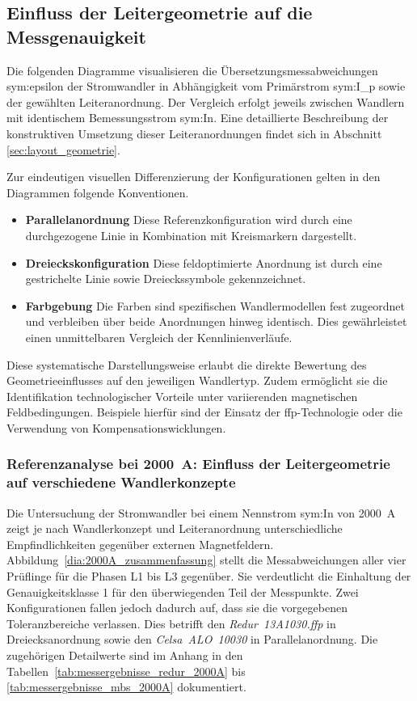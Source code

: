 \subsection{Einfluss der Leitergeometrie auf die Messgenauigkeit}
\label{sec:einfluss_leitergeometrie}

Die folgenden Diagramme visualisieren die Übersetzungsmessabweichungen \gls{sym:epsilon} der Stromwandler in Abhängigkeit vom Primärstrom \gls{sym:I_p} sowie der gewählten Leiteranordnung. Der Vergleich erfolgt jeweils zwischen Wandlern mit identischem Bemessungsstrom \gls{sym:In}. Eine detaillierte Beschreibung der konstruktiven Umsetzung dieser Leiteranordnungen findet sich in Abschnitt \ref{sec:layout_geometrie}.

Zur eindeutigen visuellen Differenzierung der Konfigurationen gelten in den Diagrammen folgende Konventionen.

\begin{itemize}
    \item \textbf{Parallelanordnung} Diese Referenzkonfiguration wird durch eine durchgezogene Linie in Kombination mit Kreismarkern dargestellt.
    \item \textbf{Dreieckskonfiguration} Diese feldoptimierte Anordnung ist durch eine gestrichelte Linie sowie Dreieckssymbole gekennzeichnet.
    \item \textbf{Farbgebung} Die Farben sind spezifischen Wandlermodellen fest zugeordnet und verbleiben über beide Anordnungen hinweg identisch. Dies gewährleistet einen unmittelbaren Vergleich der Kennlinienverläufe.
\end{itemize}

Diese systematische Darstellungsweise erlaubt die direkte Bewertung des Geometrieeinflusses auf den jeweiligen Wandlertyp. Zudem ermöglicht sie die Identifikation technologischer Vorteile unter variierenden magnetischen Feldbedingungen. Beispiele hierfür sind der Einsatz der \gls{ffp}-Technologie oder die Verwendung von Kompensationswicklungen.

\subsubsection{Referenzanalyse bei \SI{2000}{A}: Einfluss der Leitergeometrie auf verschiedene Wandlerkonzepte}
\label{sec:analyse_messreihe_2000A}

Die Untersuchung der Stromwandler bei einem Nennstrom \gls{sym:In} von \SI{2000}{A} zeigt je nach Wandlerkonzept und Leiteranordnung unterschiedliche Empfindlichkeiten gegenüber externen Magnetfeldern. Abbildung~\ref{dia:2000A_zusammenfassung} stellt die Messabweichungen aller vier Prüflinge für die Phasen L1 bis L3 gegenüber. Sie verdeutlicht die Einhaltung der Genauigkeitsklasse \num{1} für den überwiegenden Teil der Messpunkte. Zwei Konfigurationen fallen jedoch dadurch auf, dass sie die vorgegebenen Toleranzbereiche verlassen. Dies betrifft den \textit{Redur~13A1030.ffp} in Dreiecksanordnung sowie den \textit{Celsa~ALO~10030} in Parallelanordnung. Die zugehörigen Detailwerte sind im Anhang in den Tabellen~\ref{tab:messergebnisse_redur_2000A} bis \ref{tab:messergebnisse_mbs_2000A} dokumentiert.

